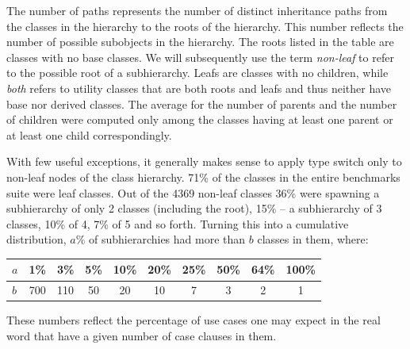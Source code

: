 The number of paths represents the number of distinct inheritance paths from the 
classes in the hierarchy to the roots of the hierarchy. This number reflects the number of possible subobjects in the 
hierarchy. The roots listed in the table are classes with no base classes. We 
will subsequently use the term \emph{non-leaf} to refer to the possible root of 
a subhierarchy. Leafs are classes with no children, while \emph{both} refers to 
utility classes that are both roots and leafs and thus neither have base nor 
derived classes. The average for the number of parents and the number of 
children were computed only among the classes having at least one parent or at 
least one child correspondingly.

With few useful exceptions, it generally makes sense to apply type switch only 
to non-leaf nodes of the class hierarchy. 71\% of the classes in the entire 
benchmarks suite were leaf classes. Out of the 4369 non-leaf classes 36\% were 
spawning a subhierarchy of only 2 classes (including the root), 15\% -- a 
subhierarchy of 3 classes, 10\% of 4, 7\% of 5 and so forth. 
Turning this into a cumulative distribution, $a\%$ of subhierarchies had more 
than $b$ classes in them, where:

\begin{tabular}
{l||@{ }c@{ }|@{ }c@{ }|@{ }c@{ }|@{ }c@{ }|@{ }c@{ }|@{ }c@{ }|@{ }c@{ }|@{ }c@{ }|@{ }c@{ }}
$a$ & 1\% & 3\% & 5\% & 10\% & 20\% & 25\% & 50\% & 64\% & 100\% \\
\hline %
$b$ & 700 & 110 & 50  & 20   & 10   & 7    & 3    & 2    & 1
\end{tabular}


\noindent
These numbers reflect the percentage of use cases one may expect in the real 
word that have a given number of case clauses in them.

